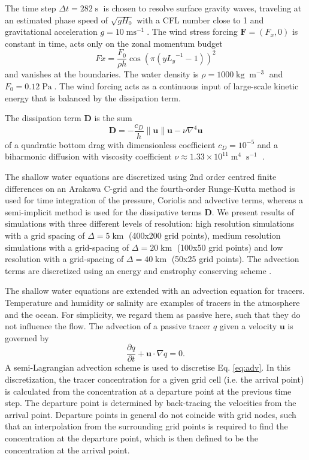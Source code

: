 \documentclass[draft]{agujournal2019}
\newcommand{\op}{\operatorname}
\begin{document}
The time step $\Delta t = 282\op{s}$ is chosen to resolve surface gravity waves,
traveling at an estimated phase speed of $\sqrt{gH_0}$ with a CFL number close to
1 and gravitational acceleration $g=10\op{ms}^{-1}$. The wind stress
forcing $\mathbf{F} = (F_x,0)$ is constant in time, acts only on the zonal momentum
budget
\begin{equation}
Fx = \frac{F_0}{\rho h} \cos\left(\pi\left(y{L_y}^{-1} - 1\right)\right)^2
\end{equation}
and vanishes at the boundaries. The water density is $\rho = 1000\op{kg}\op{m}^{-3}$
and $F_0 = 0.12\op{Pa}$. The wind forcing acts as a continuous input of large-scale
kinetic energy that is balanced by the dissipation term.

The dissipation term $\mathbf{D}$ is the sum
\begin{equation}
\mathbf{D} = -\frac{c_D}{h}\| \mathbf{u} \| \mathbf{u} - \nu \nabla^4 \mathbf{u}
\label{eq:diss}
\end{equation}
of a quadratic bottom drag with dimensionless coefficient $c_D = 10^{-5}$ \cite{Arbic2008}
and a biharmonic diffusion with viscosity coefficient $\nu \approx 1.33\times10^{11} \op{m}^4\op{s}^{-1}$ \cite{Griffies2000}.

The shallow water equations are discretized using 2nd order centred finite differences
on an Arakawa C-grid \cite{Arakawa1977} and the fourth-order Runge-Kutta method \cite{Butcher2016}
is used for time integration of the pressure, Coriolis and advective terms, whereas a
semi-implicit method is used for the dissipative terms $\mathbf{D}$. We present results
of simulations with three different levels of resolution: high resolution simulations
with a grid spacing of $\Delta = 5\operatorname{km}$ (400x200 grid points), medium
resolution simulations with a grid-spacing of $\Delta = 20\operatorname{km}$
(100x50 grid points) and low resolution with a grid-spacing of $\Delta = 40\operatorname{km}$
(50x25 grid points). The advection terms are discretized using an energy and
enstrophy conserving scheme \cite{Arakawa1990}.

The shallow water equations are extended with an advection equation for tracers.
Temperature and humidity or salinity are examples of tracers in the atmosphere
and the ocean. For simplicity, we regard them as passive here, such that they do not
influence the flow. The advection of a passive tracer $q$ given a velocity $\mathbf{u}$
is governed by
\begin{equation}
\frac{\partial q}{\partial t} + \mathbf{u} \cdot \nabla q = 0.
\label{eq:adv}
\end{equation}
A semi-Lagrangian advection scheme \cite{Smolarkiewicz1992} is used to discretise
Eq. \ref{eq:adv}. In this discretization, the tracer concentration for a given grid cell
(i.e. the arrival point) is calculated from the concentration at a departure point
at the previous time step. The departure point is determined by back-tracing the
velocities from the arrival point. Departure points in general
do not coincide with grid nodes, such that an interpolation from the surrounding grid
points is required to find the concentration at the departure point, which is then
defined to be the concentration at the arrival point.
\end{document}
